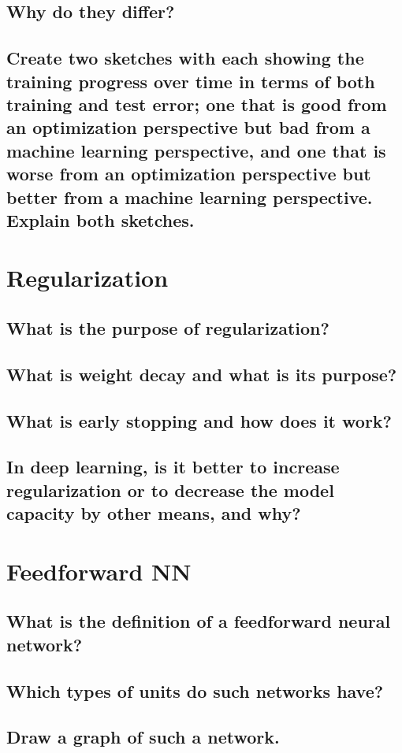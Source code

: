 \subsection{Why do they differ?}
\subsection{Create two sketches with each showing the training progress over time in terms of both training and test error; one that is good from an optimization perspective but bad from a machine learning perspective, and one that is worse from an optimization perspective but better from a machine learning perspective. Explain both sketches.}

\section{Regularization}
\subsection{What is the purpose of regularization?}
\subsection{What is weight decay and what is its purpose?}
\subsection{What is early stopping and how does it work?}
\subsection{In deep learning, is it better to increase regularization or to decrease the model capacity by other means, and why?}

\section{Feedforward NN}
\subsection{What is the definition of a feedforward neural network?}
\subsection{Which types of units do such networks have?}
\subsection{Draw a graph of such a network.}


